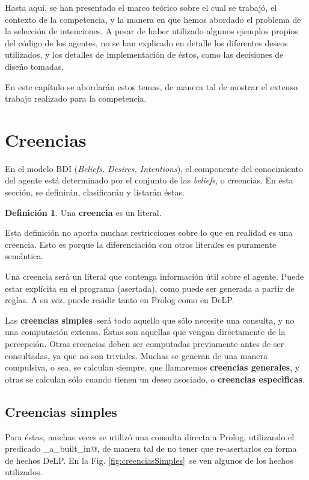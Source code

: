 \documentclass[oneside]{book}
\theoremstyle{definition}
\newtheorem{definicion}{Definición}[section]
\theoremstyle{example}
\begin{document}
Hasta aquí, se han presentado el marco teórico sobre el cual se trabajó, el contexto
de la competencia, y la manera en que hemos abordado el problema de la selección de
intenciones. A pesar de haber utilizado algunos ejemplos propios del código de los 
agentes, no se han explicado en detalle los diferentes deseos utilizados, y los 
detalles de implementación de éstos, como las decisiones de diseño tomadas.

En este capítulo se abordarán estos temas, de manera tal de mostrar el extenso 
trabajo realizado para la competencia.

\section{Creencias}

\label{sec:creencias}

En el modelo BDI (\textit{Beliefs, Desires, Intentions}), el componente del conocimiento
del agente está determinado por el conjunto de las \textit{beliefs}, o creencias. En esta
sección, se definirán, clasificarán y listarán éstas.

\begin{definicion}
	Una \textbf{creencia} es un literal.
\end{definicion}

Esta definición no aporta muchas restricciones sobre lo que en realidad es una creencia.
Esto es porque la diferenciación con otros literales es puramente semántica.

Una creencia será un literal que contenga información útil sobre el agente. Puede estar
explícita en el programa (asertada), como puede ser generada a partir de reglas. A su vez,
puede residir tanto en Prolog como en DeLP.

Las \textbf{creencias simples}\ será todo aquello que sólo necesite una consulta, y no
una computación extensa. Éstas son aquellas que vengan directamente de la percepción. 
Otras creencias deben ser computadas previamente antes de ser consultadas, ya que no
son triviales. Muchas se generan de una manera compulsiva, o sea, se calculan siempre,
que llamaremos \textbf{creencias generales},
y otras se calculan sólo cuando tienen un deseo asociado, o \textbf{creencias 
especìficas}.


\subsection{Creencias simples}


Para éstas, muchas veces se utilizó una consulta directa a Prolog,
utilizando el predicado \verb@is_a_built_in@, de manera tal de no tener que 
re-asertarlos en forma de hechos DeLP. En la Fig. \ref{fig:creenciasSimples}\ se ven
algunos de los hechos utilizados.
\end{document}
